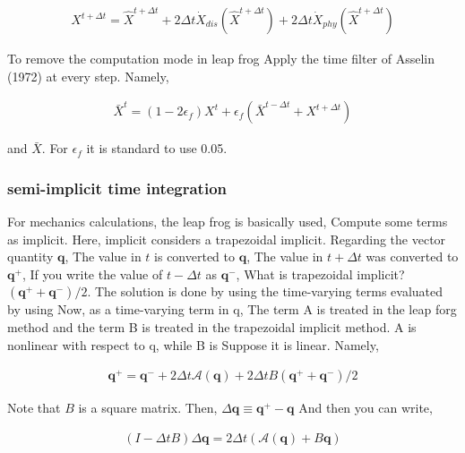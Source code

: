 \begin{eqnarray}
  {X}^{t+\Delta t}
    =  \hat{X}^{t+\Delta t}
    + 2 \Delta t
      \dot{X}_{dis}\left( \hat{X}^{t+\Delta t} \right)
    + 2 \Delta t
      \dot{X}_{phy}\left( \hat{X}^{t+\Delta t} \right)
\end{eqnarray}

To remove the computation mode in leap frog Apply the time filter of
Asselin (1972) at every step. Namely,

\begin{eqnarray}
  \bar{X}^{t}
    = ( 1-2 \epsilon_f ) {X}^{t}
    +  \epsilon_f
        \left( \bar{X}^{t-\Delta t} + {X}^{t+\Delta t} \right)
\end{eqnarray}

and \(\bar{X}\). For \(\epsilon_f\) it is standard to use 0.05.

\hypertarget{semi-implicit-time-integration}{%
\subsubsection{semi-implicit time
integration}\label{semi-implicit-time-integration}}

For mechanics calculations, the leap frog is basically used, Compute
some terms as implicit. Here, implicit considers a trapezoidal implicit.
Regarding the vector quantity \({\mathbf q}\), The value in \(t\) is
converted to \({\mathbf q}\), The value in \(t+\Delta t\) was converted
to \({\mathbf q}^+\), If you write the value of \(t-\Delta t\) as
\({\mathbf q}^-\), What is trapezoidal implicit?
\(({\mathbf q}^+ + {\mathbf q}^- )/2\). The solution is done by using
the time-varying terms evaluated by using Now, as a time-varying term in
{q}, The term A is treated in the leap forg method and the term B is
treated in the trapezoidal implicit method. A is nonlinear with respect
to {q}, while B is Suppose it is linear. Namely,

\begin{eqnarray}
  {\mathbf q}^+
      = {\mathbf q}^-
      + 2 \Delta t {\mathcal A}( {\mathbf q}  )
      + 2 \Delta t B (   {\mathbf q}^+
                       + {\mathbf q}^-   )/2
\end{eqnarray}

Note that \(B\) is a square matrix. Then,
\(\Delta {\mathbf q} \equiv {\mathbf q}^+ - {\mathbf q}\) And then you
can write,

\begin{eqnarray}
  ( I - \Delta t B ) \Delta {\mathbf q}
      = 2 \Delta t \left( {\mathcal A}({\mathbf q})
                         + B {\mathbf q} \right)
\end{eqnarray}

